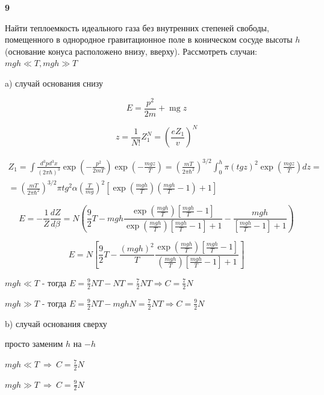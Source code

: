 \documentclass[a4paper,12pt]{article} %
\begin{document}
\begin{ttask}\textbf{9}

Найти теплоемкость идеального газа без внутренних степеней свободы, помещенного в однородное гравитационное поле в коническом сосуде высоты $ h $ (основание конуса расположено внизу, вверху). Рассмотреть случаи:
$ m g h \ll T, m g h \gg T $


a) случай основания снизу

\[ E=\frac{p^{2}}{2 m}+\operatorname{mg} z \]


\[ z=\frac{1}{N!} Z_{1}^{N}=
\left(\frac{e Z_{1}}{v}\right)^{N} \]

\begin{multline}
 Z_1= \int \frac{d^3 p d^3 x}{(2\pi \hbar)^3}\exp \left(-\frac{p^2}{2mT}\right) \exp \left(-\frac{mgz}{T}\right)= \left(\frac{mT}{2\pi \hbar^2}\right)^{3/2}\int_{0}^{h} \pi ( tg z)^2\exp \left(\frac{mgz}{T}\right) dz=\\
=\left(\frac{mT}{2\pi \hbar^2}\right)^{3/2} 
\pi tg^2 \alpha \left(\frac{T}{mg}\right)^2
\left[ \exp\left(\frac{m gh}{T}\right)
\left(\frac{m g h}{T}-1 \right)+1\right]
\end{multline}

\[ E=-\frac{1}{Z} \frac{d Z}{d \beta}=N\left(\frac{9}{2} T- 
m g h\frac{\exp\left( \frac{mgh}{T}\right)\left[\frac{mgh}{T}-1\right]}
{\exp\left( \frac{mgh}{T}\right) \left[\frac{mgh}{T}-1\right]+1}-
\frac{mgh}{\left[\frac{mgh}{T}-1\right]+1}\right) \]

\[ E=N\left[\frac{9}{2}T -\frac{(mgh)^2}{T} \frac{\exp \left( \frac{mgh}{T}\right)\left[\frac{mgh}{T}-1\right] }{\left( \frac{mgh}{T}\right)\left[\frac{mgh}{T}-1\right]+1}\right] \]



$m g h\ll T$ - тогда $E=\frac{9}{2} N T-N T=\frac{7}{2} N T \Rightarrow C=\frac{7}{2} N$


$m g h\gg T$ - тогда $E=\frac{9}{2} N T-mghN=\frac{7}{2} N T \Rightarrow C=\frac{9}{2} N$




b) случай основания сверху

просто заменим $ h$ на $ -h $




$m g h\ll T \ \Rightarrow \ C=\frac{7}{2} N$


$m g h\gg T \ \Rightarrow \ C=\frac{9}{2} N$




\end{ttask}
\end{document}
